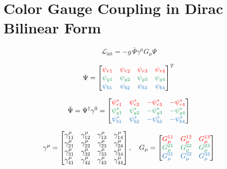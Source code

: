 \documentclass{article}
\begin{document}
    \section*{Color Gauge Coupling in Dirac Bilinear Form}

    \[
        \mathcal{L}_{\text{int}} = -g \, \bar{\Psi} \gamma^\mu G_\mu \Psi
    \]

    \[
        \Psi =
        \begin{bmatrix}
            \textcolor{red}{\psi_{r1}} &
            \textcolor{red}{\psi_{r2}} &
            \textcolor{red}{\psi_{r3}} &
            \textcolor{red}{\psi_{r4}} \\
            \textcolor{ForestGreen}{\psi_{g1}} &
            \textcolor{ForestGreen}{\psi_{g2}} &
            \textcolor{ForestGreen}{\psi_{g3}} &
            \textcolor{ForestGreen}{\psi_{g4}} \\
            \textcolor{RoyalBlue}{\psi_{b1}} &
            \textcolor{RoyalBlue}{\psi_{b2}} &
            \textcolor{RoyalBlue}{\psi_{b3}} &
            \textcolor{RoyalBlue}{\psi_{b4}}
        \end{bmatrix}^T
    \]

    \[
        \bar{\Psi} = \Psi^\dagger \gamma^0 =
        \begin{bmatrix}
            \textcolor{red}{\psi^*_{r1}} &
            \textcolor{red}{\psi^*_{r2}} &
            \textcolor{red}{-\psi^*_{r3}} &
            \textcolor{red}{-\psi^*_{r4}} \\
            \textcolor{ForestGreen}{\psi^*_{g1}} &
            \textcolor{ForestGreen}{\psi^*_{g2}} &
            \textcolor{ForestGreen}{-\psi^*_{g3}} &
            \textcolor{ForestGreen}{-\psi^*_{g4}} \\
            \textcolor{RoyalBlue}{\psi^*_{b1}} &
            \textcolor{RoyalBlue}{\psi^*_{b2}} &
            \textcolor{RoyalBlue}{-\psi^*_{b3}} &
            \textcolor{RoyalBlue}{-\psi^*_{b4}}
        \end{bmatrix}
    \]

    \[
        \gamma^\mu =
        \begin{bmatrix}
            \gamma^\mu_{11} & \gamma^\mu_{12} & \gamma^\mu_{13} & \gamma^\mu_{14} \\
            \gamma^\mu_{21} & \gamma^\mu_{22} & \gamma^\mu_{23} & \gamma^\mu_{24} \\
            \gamma^\mu_{31} & \gamma^\mu_{32} & \gamma^\mu_{33} & \gamma^\mu_{34} \\
            \gamma^\mu_{41} & \gamma^\mu_{42} & \gamma^\mu_{43} & \gamma^\mu_{44}
        \end{bmatrix}, \quad
        G_\mu =
        \begin{bmatrix}
            \textcolor{red}{G_\mu^{11}} & \textcolor{red}{G_\mu^{12}} & \textcolor{red}{G_\mu^{13}} \\
            \textcolor{ForestGreen}{G_\mu^{21}} & \textcolor{ForestGreen}{G_\mu^{22}} & \textcolor{ForestGreen}{G_\mu^{23}} \\
            \textcolor{RoyalBlue}{G_\mu^{31}} & \textcolor{RoyalBlue}{G_\mu^{32}} & \textcolor{RoyalBlue}{G_\mu^{33}}
        \end{bmatrix}
    \]
\end{document}
